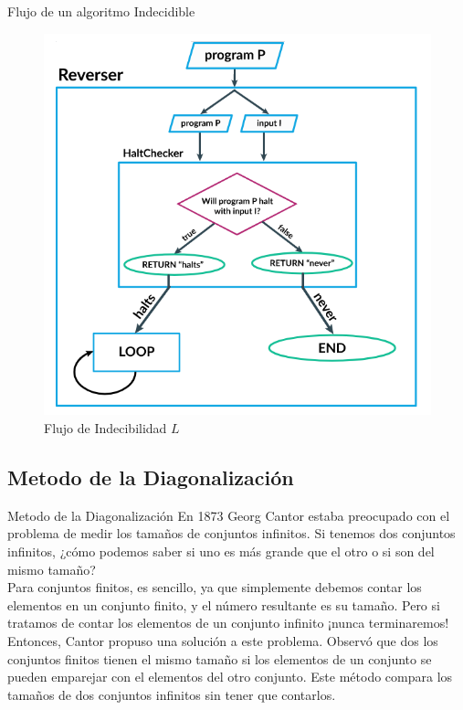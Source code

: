 \documentclass[11pt]{beamer}
\begin{document}
		
		\begin{frame}{Flujo de un algoritmo Indecidible}
		
		    \justifying
		    
		    \begin{figure}[H]
				\centering
				\includegraphics[scale=0.5]{img/inde_algoritmo.png}
				\caption{Flujo de Indecibilidad $L$}
				\label{fig: Flujo de Indecibilidad}
			\end{figure}
		    
		\end{frame}
		
		
		
	\subsection{Metodo de la Diagonalización}
	    \begin{frame}{Metodo de la Diagonalización}
			\justifying
			En 1873 Georg Cantor estaba preocupado
            con el problema de medir los tamaños de conjuntos infinitos. Si tenemos dos conjuntos infinitos, ¿cómo podemos saber si uno es más grande que el otro o si son del mismo tamaño? \\
            Para conjuntos finitos, es sencillo, ya que simplemente debemos contar los elementos en un conjunto finito, y el número resultante es su tamaño. Pero
            si tratamos de contar los elementos de un conjunto infinito ¡nunca terminaremos! \\
            Entonces, Cantor propuso una solución a este problema. Observó que dos los conjuntos finitos tienen el mismo tamaño si los elementos de un conjunto se pueden emparejar con el
            elementos del otro conjunto. Este método compara los tamaños de dos conjuntos infinitos sin tener que contarlos.
		\end{frame}
		
\end{document}
